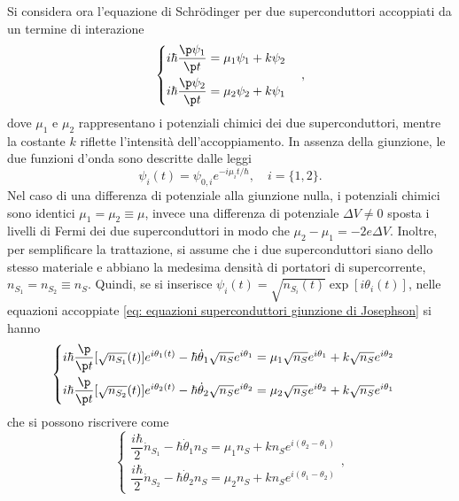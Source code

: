 Si considera ora l'equazione di Schr\"odinger per due superconduttori accoppiati da un termine di interazione 
\begin{equation}
\label{eq: equazioni superconduttori giunzione di Josephson}
    \begin{cases}
        i\hbar\dfrac{\p \psi_1}{\p t} = \mu_1\psi_1 + k\psi_2 \\[2ex]
        i\hbar\dfrac{\p \psi_2}{\p t} = \mu_2\psi_2 + k\psi_1
    \end{cases},
\end{equation}
dove $\mu_1$ e $\mu_2$ rappresentano i potenziali chimici dei due superconduttori, mentre la costante $k$ riflette l'intensità dell'accoppiamento. In assenza della giunzione, le due funzioni d'onda sono descritte dalle leggi 
\begin{equation}
    \psi_i(t) = \psi_{0,i}e^{-i\mu_it/\hbar},\quad i = \{1,2\}.
\end{equation}
Nel caso di una differenza di potenziale alla giunzione nulla, i potenziali chimici sono identici $\mu_1 = \mu_2 \equiv \mu$, invece una differenza di potenziale $\Delta V \neq 0$ sposta i livelli di Fermi dei due superconduttori in modo che $\mu_2 - \mu_1 = -2e\Delta V$. Inoltre, per semplificare la trattazione, si assume che i due superconduttori siano dello stesso materiale e abbiano la medesima densità di portatori di supercorrente, $n_{S_1} = n_{S_2} \equiv n_S$. Quindi, se si inserisce $\psi_i(t) = \sqrt{n_{S_i}(t)}\exp{[i\theta_i(t)]}$, nelle equazioni accoppiate \eqref{eq: equazioni superconduttori giunzione di Josephson} si hanno
\begin{equation}
    \begin{cases}
        i\hbar\dfrac{\p}{\p t}[\sqrt{n_{S_1}}(t)]e^{i\theta_1(t)} - \hbar\dot{\theta}_1\sqrt{n_S}e^{i\theta_1} = \mu_1\sqrt{n_S}e^{i\theta_1} + k\sqrt{n_S}e^{i\theta_2} \\[2ex]
        i\hbar\dfrac{\p}{\p t}[\sqrt{n_{S_2}}(t)]e^{i\theta_2(t)} - \hbar\dot{\theta}_2\sqrt{n_S}e^{i\theta_2} = \mu_2\sqrt{n_S}e^{i\theta_2} + k\sqrt{n_S}e^{i\theta_1}
    \end{cases}
\end{equation}
che si possono riscrivere come
\begin{equation}
    \begin{cases}
        \dfrac{i\hbar}{2}\dot{n}_{S_1} - \hbar\dot{\theta}_1n_S = \mu_1 n_S + kn_Se^{i(\theta_2 - \theta_1)} \\[2ex]
        \dfrac{i\hbar}{2}\dot{n}_{S_2} - \hbar\dot{\theta}_2n_S = \mu_2 n_S + kn_Se^{i(\theta_1 - \theta_2)}
    \end{cases},
\end{equation}
